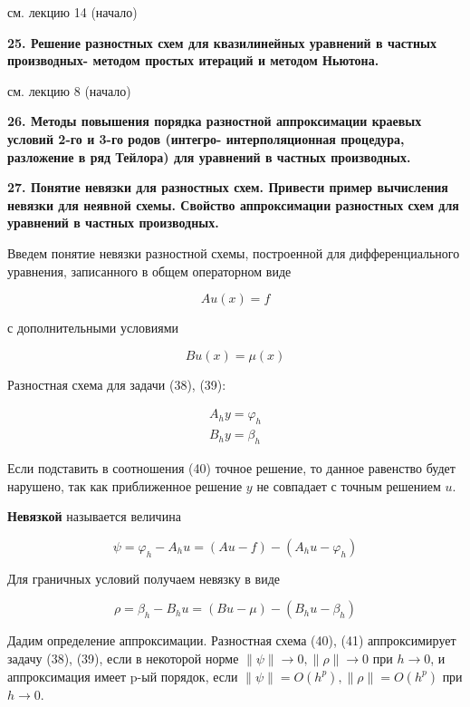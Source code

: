 \documentclass[a4paper,14pt]{article}
\begin{document}
см. лекцию 14 (начало)

\textbf{25. Решение разностных схем для квазилинейных уравнений в частных производных- методом простых итераций и методом  Ньютона.}

см. лекцию 8 (начало)

\textbf{26. Методы повышения порядка разностной аппроксимации  краевых условий 2-го и 3-го родов (интегро- интерполяционная процедура, разложение в ряд Тейлора) для уравнений в частных производных.}


\textbf{27. Понятие невязки для разностных схем. Привести пример вычисления невязки для неявной схемы.  Свойство аппроксимации разностных схем для уравнений в частных производных.}

Введем понятие невязки разностной схемы, построенной для дифференциального
уравнения, записанного в общем операторном виде

\begin{equation}
	Au(x) = f
\end{equation}

с дополнительными условиями

\begin{equation}
	Bu(x) = \mu(x)
\end{equation}

Разностная схема для задачи (38), (39):

\begin{eqnarray}
	A_h y = \varphi_h \\
	B_h y = \beta_h
\end{eqnarray}

Если подставить в соотношения (40) точное решение, то данное равенство будет
нарушено, так как приближенное решение $y$ не совпадает с точным решением $u$.

\textbf{Невязкой} называется величина

\begin{equation}
	\psi = \varphi_h - A_h u = (Au - f) - (A_h u -\varphi_h)
\end{equation}

Для граничных условий получаем невязку в виде

\begin{equation}
	\rho = \beta_h - B_h u = (Bu - \mu) - (B_h u - \beta_h)
\end{equation}

Дадим определение аппроксимации. Разностная схема (40), (41) аппроксимирует 
задачу (38), (39), если в некоторой норме $\| \psi \| \rightarrow 0, \| \rho \| \rightarrow 0$ 
при $h \rightarrow0$, и аппроксимация имеет p-ый порядок, если
$\| \psi \| = O(h^p),  \| \rho \| = O(h^p)$ при $h \rightarrow0$.
\end{document}
